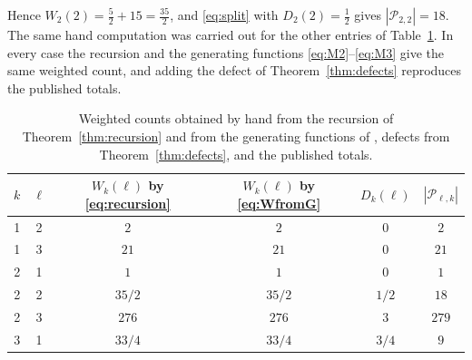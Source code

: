 \documentclass[11pt,a4paper]{article}
\theoremstyle{definition}
\newcommand{\cP}{\mathcal{P}}
\begin{document}
Hence $W_2(2)=\tfrac52+15=\tfrac{35}{2}$, and \eqref{eq:split} with $D_2(2)=\tfrac12$ gives $|\cP_{2,2}|=18$. The same hand computation was carried out for the other entries of Table~\ref{tab:low}. In every case the recursion and the generating functions \eqref{eq:M2}--\eqref{eq:M3} give the same weighted count, and adding the defect of Theorem~\ref{thm:defects} reproduces the published totals.

\begin{table}[t]
\centering
\begin{tabular}{cccccc}
\toprule
$k$ & $\ell$ & $W_k(\ell)$ by \eqref{eq:recursion} & $W_k(\ell)$ by \eqref{eq:WfromG} & $D_k(\ell)$ & $|\cP_{\ell,k}|$ \cite{YuZhang26}\\
\midrule
1 & 2 & $2$ & $2$ & $0$ & $2$\\
1 & 3 & $21$ & $21$ & $0$ & $21$\\
2 & 1 & $1$ & $1$ & $0$ & $1$\\
2 & 2 & $35/2$ & $35/2$ & $1/2$ & $18$\\
2 & 3 & $276$ & $276$ & $3$ & $279$\\
3 & 1 & $33/4$ & $33/4$ & $3/4$ & $9$\\
\bottomrule
\end{tabular}
\caption{Weighted counts obtained by hand from the recursion of Theorem~\ref{thm:recursion} and from the generating functions of \cite{Mansouri22}, defects from Theorem~\ref{thm:defects}, and the published totals.}
\label{tab:low}
\end{table}
\end{document}

